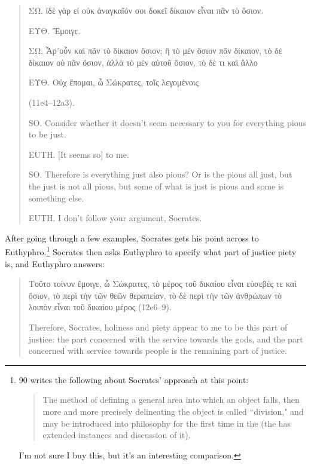 \documentclass[11pt]{article}
\begin{document}
\begin{quote}

    {\g
    ΣΩ. ἰδὲ γὰρ εἰ οὐκ ἀναγκαῖόν σοι δοκεῖ δίκαιον εἶναι πᾶν τὸ ὅσιον.

    ΕΥΘ. Ἔμοιγε.

    ΣΩ. Ἆρ᾽οὖν καὶ πᾶν τὸ δίκαιον ὅσιον; ἢ τὸ μὲν ὅσιον πᾶν δίκαιον, τὸ δὲ
    δίκαιον οὐ πᾶν ὅσιον, ἀλλὰ τὸ μὲν αὐτοῦ ὅσιον, τὸ δὲ τι καὶ ἄλλο

    ΕΥΘ. Οὐχ ἕπομαι, ὦ Σώκρατες, τοῖς λεγομένοις
    } (11e4--12a3).

    SO. Consider whether it doesn't seem necessary to you for everything
    pious to be just.

    EUTH. [It seems so] to me.

    SO. Therefore is everything just also pious? Or is the pious all just,
    but the just is not all pious, but some of what is just is pious and
    some is something else.

    EUTH. I don't follow your argument, Socrates.

\end{quote}

After going through a few examples, Socrates gets his point across to
Euthyphro.\footnote{\citet{bailly2003} 90 writes the following about
Socrates' approach at this point:

\begin{quote}

    The method of defining a general area into which an object falls, then
    more and more precisely delineating the object is called ``division,"
    and may be introduced into philosophy for the first time in the
     (the  has extended instances and
    discussion of it).

\end{quote}

I'm not sure I buy this, but it's an interesting comparison.}  Socrates
then asks Euthyphro to specify what part of justice piety is, and Euthyphro
answers:

\begin{quote}

    {\g
    Τοῦτο τοίνυν ἔμοιγε, ὦ Σώκρατες, τὸ μέρος τοῦ δικαίου εἶναι εὐσεβές τε
    καὶ ὅσιον, τὸ περὶ τὴν τῶν θεῶν θεραπείαν, τὸ δὲ περὶ τὴν τῶν ἀνθρώπων
    τὸ λοιπὸν εἶναι τοῦ δικαίου μέρος
    } (12e6--9).

    Therefore, Socrates, holiness and piety appear to me to be this part of
    justice: the part concerned with the service towards the gods, and the
    part concerned with service towards people is the remaining part of
    justice.

\end{quote}
\end{document}

